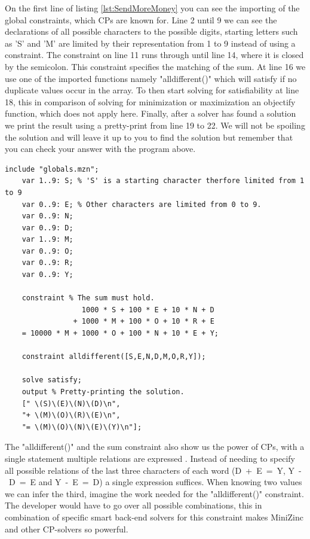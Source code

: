 \label{sendMoreMoneyExplanation}
On the first line of listing \ref{lst:SendMoreMoney} you can see the importing of the global constraints, which CPs are known for. Line 2 until 9 we can see the declarations of all possible characters to the possible digits, starting letters such as 'S' and 'M' are limited by their representation from 1 to 9 instead of using a constraint. The constraint on line 11 runs through until line 14, where it is closed by the semicolon. This constraint specifies the matching of the sum. At line 16 we use one of the imported functions namely "alldifferent()" which will satisfy if no duplicate values occur in the array. To then start solving for satisfiability at line 18, this in comparison of solving for minimization or maximization an objectify function, which does not apply here. Finally, after a solver has found a solution we print the result using a pretty-print from line 19 to 22.
We will not be spoiling the solution and will leave it up to you to find the solution but remember that you can check your answer with the program above.

\begin{minipage}{0.948\textwidth}
\begin{lstlisting}[language=minizinc, label={lst:SendMoreMoney}, caption={Solution to the puzzle "send more money" modified and taken from \url{https://www.minizinc.org/doc-2.5.5/en/downloads/send-more-money.mzn}.}]
	include "globals.mzn";
	var 1..9: S; % 'S' is a starting character therfore limited from 1 to 9
	var 0..9: E; % Other characters are limited from 0 to 9.
	var 0..9: N;
	var 0..9: D;
	var 1..9: M;
	var 0..9: O;
	var 0..9: R;
	var 0..9: Y;
	
	constraint % The sum must hold.
                  1000 * S + 100 * E + 10 * N + D
                + 1000 * M + 100 * O + 10 * R + E
    = 10000 * M + 1000 * O + 100 * N + 10 * E + Y;
	
	constraint alldifferent([S,E,N,D,M,O,R,Y]);
	
	solve satisfy;
	output % Pretty-printing the solution.
	[" \(S)\(E)\(N)\(D)\n",
	"+ \(M)\(O)\(R)\(E)\n",
	"= \(M)\(O)\(N)\(E)\(Y)\n"];
\end{lstlisting}
\end{minipage}


The "alldifferent()" and the sum constraint also show us the power of CPs, with a single statement multiple relations are expressed \cite{53marriott1998programming}. Instead of needing to specify all possible relations of the last three characters of each word (\mbox{D + E = Y}, \mbox{Y - D = E} and \mbox{Y - E = D}) a single expression suffices. When knowing two values we can infer the third, imagine the work needed for the "alldifferent()" constraint. The developer would have to go over all possible combinations, this in combination of specific smart back-end solvers for this constraint makes MiniZinc and other CP-solvers so powerful. 

